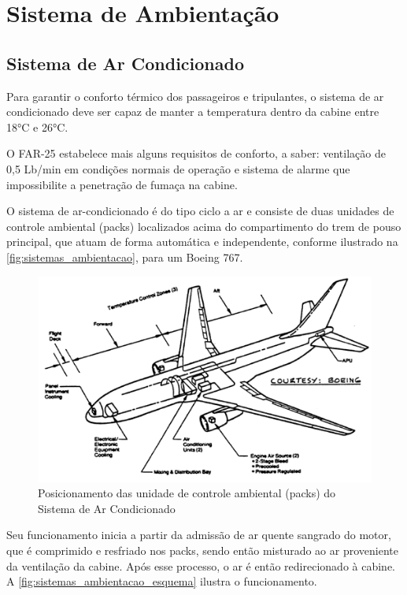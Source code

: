 \section{Sistema de Ambientação}

\subsection{Sistema de Ar Condicionado}

Para garantir o conforto térmico dos passageiros e tripulantes, o sistema de ar condicionado deve ser capaz de manter a temperatura dentro da cabine entre 18°C e 26°C.

O FAR-25 estabelece mais alguns requisitos de conforto, a saber: ventilação de 0,5 Lb/min em condições normais de operação e sistema de alarme que impossibilite a penetração de fumaça na cabine.

O sistema de ar-condicionado é do tipo ciclo a ar e consiste de duas unidades de controle ambiental (packs) localizados acima do compartimento do trem de pouso principal, que atuam de forma automática e independente, conforme ilustrado na \autoref{fig:sistemas_ambientacao}, para um Boeing 767.

\begin{figure}
\includegraphics[width=\textwidth]{images/parte3/sistemas_ambientacao.png}
\caption{Posicionamento das unidade de controle ambiental (packs) do Sistema de Ar Condicionado}
\label{fig:sistemas_ambientacao}
\end{figure}

Seu funcionamento inicia a partir da admissão de ar quente sangrado do motor, que é comprimido e resfriado nos packs, sendo então misturado ao ar proveniente da ventilação da cabine.
Após esse processo, o ar é então redirecionado à cabine.
A \autoref{fig:sistemas_ambientacao_esquema} ilustra o funcionamento.

